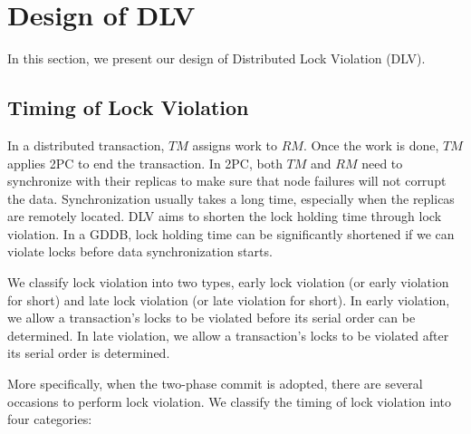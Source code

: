 \documentclass[conference]{IEEEtran}
\begin{document}
\section{Design of DLV}
\label{sec:implement}

In this section, we present our design of Distributed Lock Violation (DLV).

\subsection {Timing of Lock Violation}


In a distributed transaction, $TM$ assigns work to $RM$. Once the work is done, $TM$ applies 2PC to end the transaction.
In 2PC, both $TM$ and $RM$ need to synchronize with their replicas to make sure that node failures will not corrupt the data.
Synchronization usually takes a long time, especially when the replicas are remotely located.
DLV aims to shorten the lock holding time through lock violation.
In a GDDB, lock holding time can be significantly shortened if we can violate locks before data synchronization starts.

We classify lock violation into two types, early lock violation (or early violation for short) and late lock violation (or late violation for short).
In early violation,  we allow a transaction's locks to be violated before its serial order can be determined.
In late violation,  we allow a transaction's locks to be violated after its serial order is determined.


More specifically, when the two-phase commit is adopted, there are several occasions to perform lock violation.
We classify the timing of lock violation into four categories:
\end{document}
